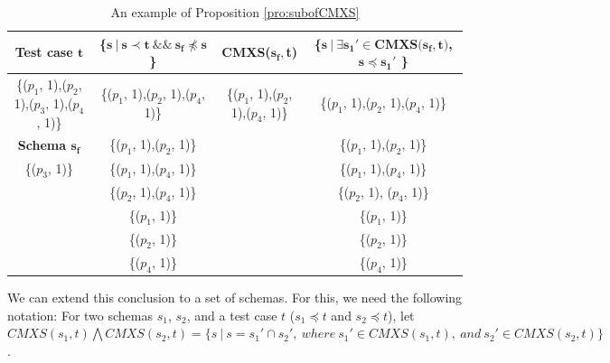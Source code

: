 \begin{table}[ht]
  \centering
  \setlength{\tabcolsep}{2pt}
  \caption{An example of Proposition \ref{pro:subofCMXS}}
  {\footnotesize
    \begin{tabular}{|c|c|c|c|}
    \hline
  \textbf{  Test case $\textbf{t}$} & \textbf{ \{$\textbf{s}\ |\ \textbf{s} \prec \textbf{t}\ \&\&\ \textbf{s}_{\textbf{f}} \npreceq \textbf{s}$\} }& \textbf{ CMXS($\textbf{s}_{\textbf{f}}, $\textbf{t}$ $)} & \textbf{\{$ \textbf{s}\ |\ \exists \textbf{s}_{\textbf{1}}' \in \textbf{CMXS}\textbf{(}\textbf{s}_{\textbf{f}}, \textbf{t}\textbf{)}$, $\textbf{s} \preceq \textbf{s}_{\textbf{1}}'$ \}}\\\hline
    \{($p_{1}$, 1),($p_{2}$, 1),($p_{3}$, 1),($p_{4}$, 1)\}  & \{($p_{1}$, 1),($p_{2}$, 1),($p_{4}$, 1)\} & \{($p_{1}$, 1),($p_{2}$, 1),($p_{4}$, 1)\} & \{($p_{1}$, 1),($p_{2}$, 1),($p_{4}$, 1)\}\\ \cline{1-1}
      \textbf{Schema $\textbf{s}_{\textbf{f}}$}  & \{($p_{1}$, 1),($p_{2}$, 1)\} &  & \{($p_{1}$, 1),($p_{2}$, 1)\} \\\cline{1-1}
     \{($p_{3}$, 1)\}         & \{($p_{1}$, 1),($p_{4}$, 1)\}&  &\{($p_{1}$, 1),($p_{4}$, 1)\}\\
          &       \{($p_{2}$, 1),($p_{4}$, 1)\} &  &\{($p_{2}$, 1), ($p_{4}$, 1)\}\\
          &       \{($p_{1}$, 1)\} &  &\{($p_{1}$, 1)\}\\
          &       \{($p_{2}$, 1)\} &  &\{($p_{2}$, 1)\}\\
          &       \{($p_{4}$, 1)\} &  & \{($p_{4}$, 1)\}\\\hline
    \end{tabular}}%
  \label{examleOfCMXSPro}%
\end{table}%

%


We can extend this conclusion to a set of schemas. For this, we need the following notation: For two schemas $s_{1}$, $s_{2}$, and a test case $t$ ($s_{1} \preceq t$ and $s_{2} \preceq t$), let $CMXS(s_{1}, t) \bigwedge CMXS(s_{2}, t)  = \{ s\ |\ s = s_{1}' \cap s_{2}',\ where\ s_{1}' \in CMXS(s_{1}, t),\ and\ s_{2}' \in CMXS(s_{2}, t) \}$.

